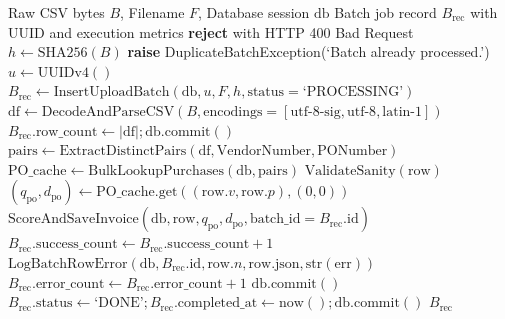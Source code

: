\documentclass[conference]{IEEEtran}
\begin{document}
\begin{algorithm}[t]
\caption{Asynchronous Batch Ingestion \& Fault Isolation}
\label{alg:batch_ingest}
\begin{algorithmic}[1]
\REQUIRE Raw CSV bytes $B$, Filename $F$, Database session $\text{db}$
\ENSURE Batch job record $B_{\text{rec}}$ with UUID and execution metrics
    \STATE \textbf{reject} with HTTP 400 Bad Request
\ENDIF
\STATE $h \leftarrow \text{SHA256}(B)$ 
    \STATE \textbf{raise} DuplicateBatchException(`Batch already processed.')
\ENDIF
\STATE $u \leftarrow \text{UUIDv4}()$
\STATE $B_{\text{rec}} \leftarrow \text{InsertUploadBatch}(\text{db}, u, F, h, \text{status}=\text{`PROCESSING'})$
\STATE $\text{df} \leftarrow \text{DecodeAndParseCSV}(B, \text{encodings}=[\text{utf-8-sig}, \text{utf-8}, \text{latin-1}])$
\STATE $B_{\text{rec}}.\text{row\_count} \leftarrow |\text{df}|; \text{db.commit}()$
\STATE $\text{pairs} \leftarrow \text{ExtractDistinctPairs}(\text{df}, \text{VendorNumber}, \text{PONumber})$
\STATE $\text{PO\_cache} \leftarrow \text{BulkLookupPurchases}(\text{db}, \text{pairs})$
        \TRY
            \STATE $\text{ValidateSanity}(\text{row})$ 
            \STATE $(q_{\text{po}}, d_{\text{po}}) \leftarrow \text{PO\_cache.get}((\text{row}.v, \text{row}.p), (0, 0))$
            \STATE $\text{ScoreAndSaveInvoice}(\text{db}, \text{row}, q_{\text{po}}, d_{\text{po}}, \text{batch\_id}=B_{\text{rec}}.\text{id})$
            \STATE $B_{\text{rec}}.\text{success\_count} \leftarrow B_{\text{rec}}.\text{success\_count} + 1$
            \STATE $\text{LogBatchRowError}(\text{db}, B_{\text{rec}}.\text{id}, \text{row}.n, \text{row.json}, \text{str}(\text{err}))$
            \STATE $B_{\text{rec}}.\text{error\_count} \leftarrow B_{\text{rec}}.\text{error\_count} + 1$
        \ENDTRY
    \ENDFOR
    \STATE $\text{db.commit}()$ 
\ENDFOR
\STATE $B_{\text{rec}}.\text{status} \leftarrow \text{`DONE'}; B_{\text{rec}}.\text{completed\_at} \leftarrow \text{now}(); \text{db.commit}()$
\RETURN $B_{\text{rec}}$
\end{algorithmic}
\end{algorithm}
\end{document}
